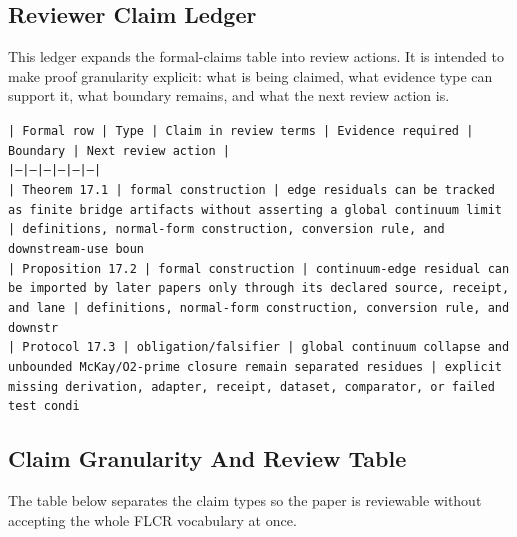 \documentclass[11pt]{article}
\begin{document}
\subsection*{Reviewer Claim Ledger}

This ledger expands the formal-claims table into review actions. It is intended to make proof granularity explicit: what is being claimed, what evidence type can support it, what boundary remains, and what the next review action is.

\noindent\texttt{| Formal row | Type | Claim in review terms | Evidence required | Boundary | Next review action |}\\
\noindent\texttt{|---|---|---|---|---|---|}\\
\noindent\texttt{| Theorem 17.1 | formal construction | edge residuals can be tracked as finite bridge artifacts without asserting a global continuum limit | definitions, normal-form construction, conversion rule, and downstream-use boun}\\
\noindent\texttt{| Proposition 17.2 | formal construction | continuum-edge residual can be imported by later papers only through its declared source, receipt, and lane | definitions, normal-form construction, conversion rule, and downstr}\\
\noindent\texttt{| Protocol 17.3 | obligation/falsifier | global continuum collapse and unbounded McKay/O2-prime closure remain separated residues | explicit missing derivation, adapter, receipt, dataset, comparator, or failed test condi}\\

\subsection*{Claim Granularity And Review Table}

The table below separates the claim types so the paper is reviewable without accepting the whole FLCR vocabulary at once.
\end{document}
